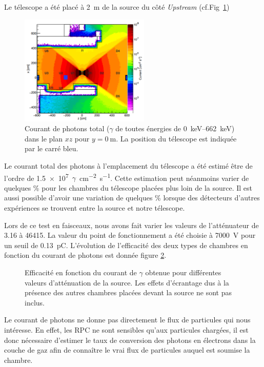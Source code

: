 Le télescope a été placé à \SI{2}{\meter} de la source du côté \textit{Upstream} (cf.Fig~\ref{PositionChambre})

\begin{figure}[!ht]
	\centering
	\includegraphics[width=0.55\textwidth]{GLA/PositionChamber.png}
	\caption{Courant de photons total ($\gamma$ de toutes énergies de \SIrange{0}{662}{\kilo\eV}) dans le plan $xz$ pour $y=\SI{0}{\meter}$. La position du télescope est indiquée par le carré bleu.}
	\label{PositionChambre}
\end{figure}

Le courant total des photons à l'emplacement du télescope a été estimé être de l'ordre de \num{1.5e7}~$\gamma$~\si{cm^{-2}.s^{-1}}. Cette estimation peut néanmoins varier de quelques \% pour les chambres du télescope placées plus loin de la source. Il est aussi possible d'avoir une variation de quelques \% lorsque des détecteurs d'autres expériences se trouvent entre la source et notre télescope.

Lors de ce test en faisceaux, nous avons fait varier les valeurs de l'atténuateur de \num{3.16} à \num{46415}. La valeur du point de fonctionnement a été choisie à \SI{7000}{\volt} pour un seuil de \SI{0.13}{\pico\coulomb}. L'évolution de l'efficacité des deux types de chambres en fonction du courant de photons est donnée figure \ref{ATTENUATEURGIF}.

\begin{figure}[!ht]
	\centering
	\caption{Efficacité en fonction du courant de $\gamma$ obtenue pour différentes valeurs d'atténuation de la source. Les effets d'écrantage dus à la présence des autres chambres placées devant la source ne sont pas inclus.}
	\label{ATTENUATEURGIF}
\end{figure}

Le courant de photons ne donne pas directement le flux de particules qui nous intéresse. En effet, les RPC ne sont sensibles qu'aux particules chargées, il est donc nécessaire d'estimer le taux de conversion des photons en électrons dans la couche de gaz afin de connaître le vrai flux de particules auquel est soumise la chambre. 


